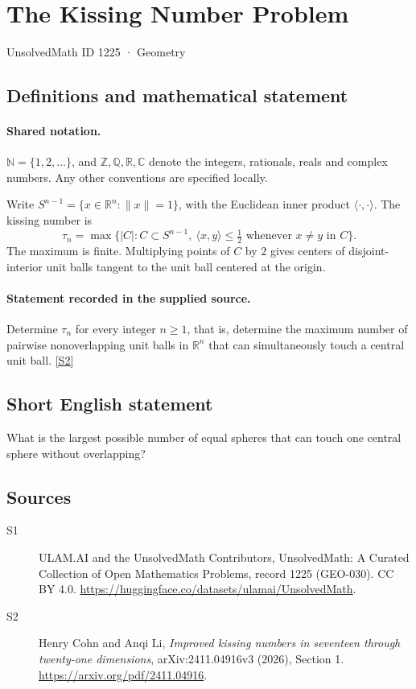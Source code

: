 \documentclass[11pt]{article}
\newcommand{\sref}[2]{\hyperlink{source:#1:#2}{[S#2]}}
\begin{document}
\setcounter{section}{1224}
\section{The Kissing Number Problem}\label{1225}
{\small\sffamily UnsolvedMath ID 1225 · Geometry}
\subsection{Definitions and mathematical statement}

\paragraph{Shared notation.}$\mathbb N=\{1,2,\ldots\}$, and $\mathbb Z,\mathbb Q,\mathbb R,\mathbb C$ denote the integers, rationals, reals and complex numbers. Any other conventions are specified locally.


Write $S^{n-1}=\{x\in\mathbb R^n:\lVert x\rVert=1\}$, with the Euclidean inner product $\langle\cdot,\cdot\rangle$. The kissing number is
\[
\tau_n=\max\{|C|:C\subset S^{n-1},\ \langle x,y\rangle\leq\tfrac12\text{ whenever }x\ne y\text{ in }C\}.
\]
The maximum is finite. Multiplying points of $C$ by $2$ gives centers of disjoint-interior unit balls tangent to the unit ball centered at the origin.
\paragraph{Statement recorded in the supplied source.}
Determine $\tau_n$ for every integer $n\geq1$, that is, determine the maximum number of pairwise nonoverlapping unit balls in $\mathbb R^n$ that can simultaneously touch a central unit ball. \sref{1225}{2}

\subsection{Short English statement}
What is the largest possible number of equal spheres that can touch one central sphere without overlapping?
\subsection{Sources}
\begin{description}
\item[\hypertarget{source:1225:1}{S1}] ULAM.AI and the UnsolvedMath Contributors, UnsolvedMath: A Curated Collection of Open Mathematics Problems, record 1225 (GEO-030). CC BY 4.0. \url{https://huggingface.co/datasets/ulamai/UnsolvedMath}.
\item[\hypertarget{source:1225:2}{S2}] Henry Cohn and Anqi Li, \emph{Improved kissing numbers in seventeen through twenty-one dimensions}, arXiv:2411.04916v3 (2026), Section 1. \url{https://arxiv.org/pdf/2411.04916}.
\end{description}
\label{end:1225}
\end{document}
